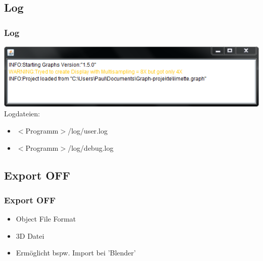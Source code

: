 \documentclass{beamer}
\begin{document}
\subsection{Log}
\begin{frame}\frametitle{Log}
 \includegraphics[width=1\textwidth]{images/program/log-window.png}\newline
Logdateien:
\begin{itemize}
  \item \(<\)Programm\(>\)/log/user.log
  \item \(<\)Programm\(>\)/log/debug.log
\end{itemize}
\end{frame}

\subsection{Export OFF}
\begin{frame}\frametitle{Export OFF}
\begin{itemize}
 \item Object File Format
 \item 3D Datei
 \item Erm\"oglicht bspw. Import bei 'Blender'
\end{itemize}
\end{frame}
\end{document}
